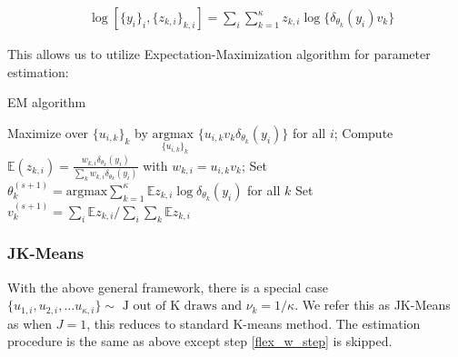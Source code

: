 \documentclass[12pt]{article}
\begin{document}
\begin{equation}
\begin{aligned}
& \log[ \{y_i\}_i, \{z_{k,i}\}_{k,i} ] =  \sum_{i}\sum_{k=1}^{\kappa} z_{k,i} \log \{\delta_{\theta_{k}}(y_i) v_k \}
\end{aligned}
\label{conditional_lik}
\end{equation}

 This allows us to utilize Expectation-Maximization algorithm for parameter estimation:

\begin{algorithm}[H]
\caption{EM algorithm}\label{alg:euclid}
\begin{algorithmic}[1]
\State Maximize over $\{ u_{i,k}\}_k$ by $ \underset{\{u_{i,k}\}_k} {\text{argmax }}\{u_{i,k}  v_{k}\delta_{\theta_{k}}(y_i)\}$ for all $i$; 
\State Compute $ \mathbb{E}(z_{k,i})= \frac{w_{k,i} \delta_{\theta_{k}}(y_i)}{\sum_k w_{k,i} \delta_{\theta_{k}}(y_i)}$ with $w_{k,i} = u_{i,k} v_{k}$; 
\State Set $\theta^{(s+1)}_{k}= \text{argmax} \sum_{k=1}^{\kappa} \mathbb{E}z_{k,i} \log \delta_{\theta_{k}}(y_i) $ for all $k$ 
\State Set $v^{(s+1)}_{k}=  \sum_{i}\mathbb{E}z_{k,i} /  \sum_{i}\sum_{k}\mathbb{E}z_{k,i}$ \label{flex_w_step}
\EndWhile
\end{algorithmic}
\end{algorithm}

\subsubsection{JK-Means}

With the above general framework, there is a special case $\{ u_{1,i},u_{2,i},\ldots u_{\kappa,i}\} \sim \text{ J out of K draws}$ and $\nu_k = 1/\kappa$. We refer this as JK-Means as when $J=1$, this reduces to standard K-means method. The estimation procedure is the same as above except step \ref{flex_w_step} is skipped.





\end{document}
